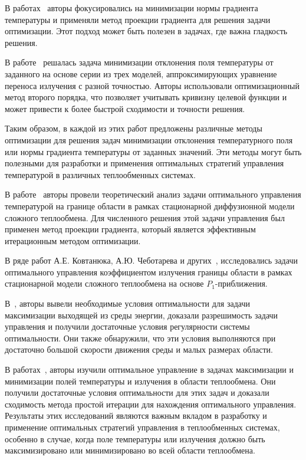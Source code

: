 В работах~\cite{clever2012optimal, Pinnau2013} авторы фокусировались на минимизации
нормы градиента температуры и применяли метод проекции градиента для решения задачи оптимизации.
Этот подход может быть полезен в задачах, где важна гладкость решения.

В работе~\cite{clever2014model} решалась задача минимизации отклонения поля температуры
от заданного на основе серии из трех моделей, аппроксимирующих уравнение переноса излучения с разной точностью.
Авторы использовали оптимизационный метод второго порядка,
что позволяет учитывать кривизну целевой функции и может привести к более быстрой сходимости и точности решения.

Таким образом, в каждой из этих работ предложены различные методы
оптимизации для решения задач минимизации отклонения температурного
поля или нормы градиента температуры от заданных значений.
Эти методы могут быть полезными для разработки и применения оптимальных
стратегий управления температурой в различных теплообменных системах.


В работе~\cite{Kovtanyuk2016Optimal} авторы провели теоретический анализ
задачи оптимального управления температурой на границе области в рамках стационарной
диффузионной модели сложного теплообмена.
Для численного решения этой задачи управления был применен метод проекции
градиента, который является эффективным итерационным методом оптимизации.

В ряде работ А.Е. Ковтанюка, А.Ю. Чеботарева и других~\cite{
Kovtanyuk2014,
astrakhantseva2017design,
Chebotarev2015,
Kovtanyuk2014TheoreticalAnalysis
}, исследовались задачи оптимального управления коэффициентом
излучения границы области в рамках стационарной модели сложного теплообмена на основе $P_1$-приближения.

В~\cite{Kovtanyuk2014, Kovtanyuk2014TheoreticalAnalysis},
авторы вывели необходимые условия оптимальности для задачи максимизации выходящей
из среды энергии, доказали разрешимость задачи управления и получили
достаточные условия регулярности системы оптимальности.
Они также обнаружили, что эти условия выполняются при достаточно
большой скорости движения среды и малых размерах области.




В работах~\cite{end2011analytical, asllanaj2003existence}, авторы изучили
оптимальное управление в задачах максимизации и минимизации
полей температуры и излучения в области теплообмена.
Они получили достаточные условия оптимальности для этих задач и доказали
сходимость метода простой итерации для нахождения оптимального управления.
Результаты этих исследований являются важным вкладом в разработку и применение
оптимальных стратегий управления в теплообменных системах, особенно в случае,
когда поле температуры или излучения должно быть максимизировано или минимизировано во всей области теплообмена.

